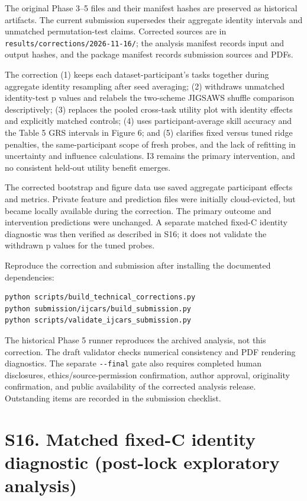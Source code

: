 \documentclass[11pt]{article}
\begin{document}
The original Phase 3--5 files and their manifest hashes are preserved as
historical artifacts. The current submission supersedes their aggregate
identity intervals and unmatched permutation-test claims. Corrected
sources are in \texttt{results/corrections/2026-11-16/}; the analysis
manifest records input and output hashes, and the package manifest
records submission sources and PDFs.

The correction (1) keeps each dataset-participant's tasks together
during aggregate identity resampling after seed averaging; (2) withdraws
unmatched identity-test p values and relabels the two-scheme JIGSAWS
shuffle comparison descriptively; (3) replaces the pooled cross-task
utility plot with identity effects and explicitly matched controls; (4)
uses participant-average skill accuracy and the Table 5 GRS intervals in
Figure 6; and (5) clarifies fixed versus tuned ridge penalties, the
same-participant scope of fresh probes, and the lack of refitting in
uncertainty and influence calculations. I3 remains the primary
intervention, and no consistent held-out utility benefit emerges.

The corrected bootstrap and figure data use saved aggregate participant
effects and metrics. Private feature and prediction files were initially
cloud-evicted, but became locally available during the correction. The
primary outcome and intervention predictions were unchanged. A separate
matched fixed-C identity diagnostic was then verified as described in
S16; it does not validate the withdrawn p values for the tuned probes.

Reproduce the correction and submission after installing the documented
dependencies:

\begin{verbatim}
python scripts/build_technical_corrections.py
python submission/ijcars/build_submission.py
python scripts/validate_ijcars_submission.py
\end{verbatim}

The historical Phase 5 runner reproduces the archived analysis, not this
correction. The draft validator checks numerical consistency and PDF
rendering diagnostics. The separate \texttt{-\/-final} gate also
requires completed human disclosures, ethics/source-permission
confirmation, author approval, originality confirmation, and public
availability of the corrected analysis release. Outstanding items are
recorded in the submission checklist.

\section{S16. Matched fixed-C identity diagnostic (post-lock exploratory
analysis)}\label{s16.-matched-fixed-c-identity-diagnostic-post-lock-exploratory-analysis}
\end{document}
